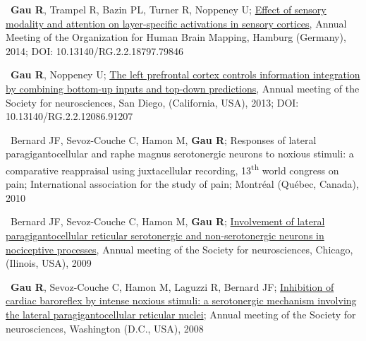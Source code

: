 \documentclass[a4paper,12pt,oneside]{letter}
\begin{document}
{\textbullet~\textbf{Gau R}, Trampel R, Bazin PL, Turner R, Noppeney U; \href{http://www.researchgate.net/profile/Remi_Gau/publication/312040995_Effect_of_sensory_modality_and_attention_on_layer-specific_activations_in_sensory_cortices/links/586bef4108ae329d621216ff.pdf?origin=publication_detail&ev=pub_int_prw_xdl&msrp=rWGQkC7vAu_P6H2YxCI3M31egmAPzpbXdoRN1OdTlFE2ytvRyytc2DItV2mPnvlGPXAOT-Q0hOx0cWKEfhvF_ZK7oOzQtXTOX1cxj1f7wdc.EjFU3lhxIUR_qptyNrCYqZDXVg6nG7zWe8VL0WxLSdSMUGnjz_v4L5Yov-RWctdEwDPFRXLasy1FBdCk7Dlydw.IANTdlTw5MPB88HQJNdTi7lFv6Sygddbknct3mMTSsgH20heYrYcKnbsQLxtcsNd-HHWZUEIEP4-7bkQLNDUhQ}{Effect of sensory modality and attention on layer-specific activations in sensory cortices}, Annual Meeting of the Organization for Human Brain Mapping, Hamburg (Germany), 2014; DOI: 10.13140/RG.2.2.18797.79846

\textbullet~\textbf{Gau R}, Noppeney U; \href{http://www.researchgate.net/profile/Remi_Gau/publication/312040995_Effect_of_sensory_modality_and_attention_on_layer-specific_activations_in_sensory_cortices/links/586bef4108ae329d621216ff.pdf?origin=publication_detail&ev=pub_int_prw_xdl&msrp=rWGQkC7vAu_P6H2YxCI3M31egmAPzpbXdoRN1OdTlFE2ytvRyytc2DItV2mPnvlGPXAOT-Q0hOx0cWKEfhvF_ZK7oOzQtXTOX1cxj1f7wdc.EjFU3lhxIUR_qptyNrCYqZDXVg6nG7zWe8VL0WxLSdSMUGnjz_v4L5Yov-RWctdEwDPFRXLasy1FBdCk7Dlydw.IANTdlTw5MPB88HQJNdTi7lFv6Sygddbknct3mMTSsgH20heYrYcKnbsQLxtcsNd-HHWZUEIEP4-7bkQLNDUhQ}{The left prefrontal cortex controls information integration by combining bottom-up inputs and top-down predictions}, Annual meeting of the Society for neurosciences, San Diego, (California, USA), 2013; DOI: 10.13140/RG.2.2.12086.91207

\textbullet~Bernard JF, Sevoz-Couche C, Hamon M, \textbf{Gau R}; Responses of lateral paragigantocellular and raphe magnus serotonergic neurons to noxious stimuli: a comparative reappraisal using juxtacellular recording, 13\textsuperscript{th} world congress on pain; International association for the study of pain; Montréal (Québec, Canada), 2010

\textbullet~Bernard JF, Sevoz-Couche C, Hamon M, \textbf{Gau R}; \href{https://osf.io/efqub/}{Involvement of lateral paragigantocellular reticular serotonergic and non-serotonergic neurons in nociceptive processes}, Annual meeting of the Society for neurosciences, Chicago, (Ilinois, USA), 2009

\textbullet~\textbf{Gau R}, Sevoz-Couche C, Hamon M, Laguzzi R, Bernard JF; \href{https://osf.io/hxkgv/}{Inhibition of cardiac baroreflex by intense noxious stimuli: a serotonergic mechanism involving the lateral paragigantocellular reticular nuclei}; Annual meeting of the Society for neurosciences, Washington (D.C., USA), 2008

}
\end{document}
